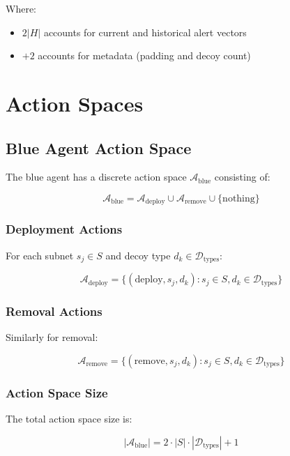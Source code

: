 \documentclass[12pt,a4paper]{article}
\begin{document}
Where:
\begin{itemize}
    \item $2|H|$ accounts for current and historical alert vectors
    \item $+2$ accounts for metadata (padding and decoy count)
\end{itemize}

\section{Action Spaces}

\subsection{Blue Agent Action Space}
The blue agent has a discrete action space $\mathcal{A}_{\text{blue}}$ consisting of:

\begin{equation}
\mathcal{A}_{\text{blue}} = \mathcal{A}_{\text{deploy}} \cup \mathcal{A}_{\text{remove}} \cup \{\text{nothing}\}
\end{equation}

\subsubsection{Deployment Actions}
For each subnet $s_j \in S$ and decoy type $d_k \in \mathcal{D}_{\text{types}}$:

\begin{equation}
\mathcal{A}_{\text{deploy}} = \{(\text{deploy}, s_j, d_k) : s_j \in S, d_k \in \mathcal{D}_{\text{types}}\}
\end{equation}

\subsubsection{Removal Actions}
Similarly for removal:

\begin{equation}
\mathcal{A}_{\text{remove}} = \{(\text{remove}, s_j, d_k) : s_j \in S, d_k \in \mathcal{D}_{\text{types}}\}
\end{equation}

\subsubsection{Action Space Size}
The total action space size is:

\begin{equation}
|\mathcal{A}_{\text{blue}}| = 2 \cdot |S| \cdot |\mathcal{D}_{\text{types}}| + 1
\end{equation}
\end{document}
